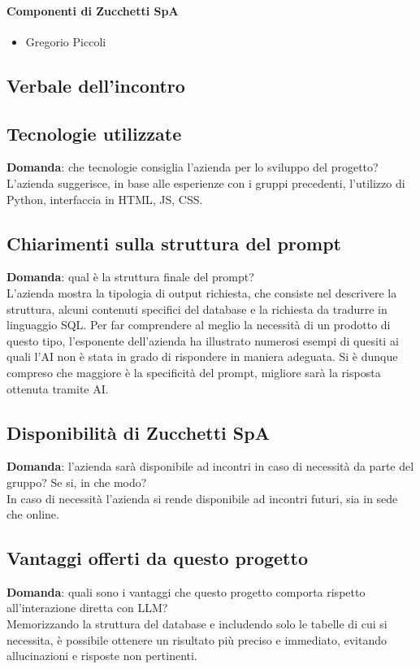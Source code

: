\documentclass[italian,12pt]{article} %
\begin{document}
\paragraph{Componenti di Zucchetti SpA}
\begin{itemize}
	\item Gregorio Piccoli
\end{itemize}

\newpage

\begin{flushleft}
\section{Verbale dell'incontro}
\subsection{Tecnologie utilizzate}
	\textbf{Domanda}: che tecnologie consiglia l'azienda per lo sviluppo del progetto?\\
	L'azienda suggerisce, in base alle esperienze con i gruppi precedenti, l'utilizzo di Python, interfaccia in HTML, JS, CSS.

\subsection{Chiarimenti sulla struttura del prompt}
	\textbf{Domanda}: qual è la struttura finale del prompt?\\
	L'azienda mostra la tipologia di output richiesta, che consiste nel descrivere la struttura, alcuni contenuti specifici del database e la richiesta da tradurre in linguaggio SQL. Per far comprendere al meglio la necessità di un prodotto di questo tipo, l’esponente dell’azienda ha illustrato numerosi esempi 
	di quesiti ai quali l’AI non è stata in grado di rispondere in maniera adeguata. Si è dunque compreso che maggiore è la specificità 
	del prompt, migliore sarà la risposta ottenuta tramite AI.

\subsection{Disponibilità di Zucchetti SpA}
	\textbf{Domanda}: l'azienda sarà disponibile ad incontri in caso di necessità da parte del gruppo? Se si, in che modo?\\
	In caso di necessità l'azienda si rende disponibile ad incontri futuri, sia in sede che online. 

\subsection{Vantaggi offerti da questo progetto}
	\textbf{Domanda}: quali sono i vantaggi che questo progetto comporta rispetto all'interazione diretta con LLM?\\
	Memorizzando la struttura del database e includendo solo le tabelle di cui si necessita, è possibile ottenere un risultato più preciso e immediato, evitando allucinazioni e risposte non pertinenti.
	

\end{flushleft}
\vspace*{3cm}
\end{document}
